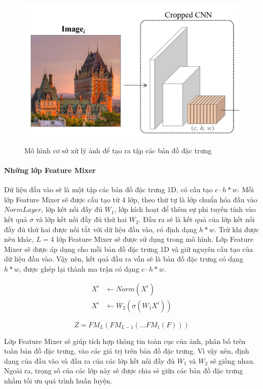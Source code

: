 \begin{figure}[H]
    \centering
    \includegraphics[scale=0.75]{pics/Proposal/cropped-cnn.png}
    \caption{Mô hình cơ sở xử lý ảnh để tạo ra tập các bản đồ đặc trưng \cite{alibey2023mixvpr}}
\end{figure}

\paragraph*{Những lớp Feature Mixer}

Dữ liệu đầu vào sẽ là một tập các bản đồ đặc trưng 1D, có cấu tạo $c \cdot h*w$. Mỗi lớp Feature Mixer sẽ được cấu tạo từ 4 lớp, theo thứ tự là lớp chuẩn hóa đầu vào $NormLayer$, lớp kết nối đầy đủ $W_1$, lớp kích hoạt để thêm sự phi tuyến tính vào kết quả $\sigma$ và lớp kết nối đầy đủ thứ hai $W_2$. Đầu ra sẽ là kết quả của lớp kết nối đầy đủ thứ hai được nối tắt với dữ liệu đầu vào, có định dạng $h*w$. Trừ khi được nêu khác, $L=4$ lớp Feature Mixer sẽ được sử dụng trong mô hình. Lớp Feature Mixer sẽ được áp dụng cho mỗi bản đồ đặc trưng 1D và giữ nguyên cấu tạo của dữ liệu đầu vào. Vậy nên, kết quả đầu ra vẫn sẽ là bản đồ đặc trưng có dạng $h*w$, được ghép lại thành ma trận có dạng $c \cdot h*w$.

$$
\begin{aligned}
    X^{i} & \leftarrow Norm(X^{i}) \\
    X^{i} & \leftarrow W_2(\sigma(W_1 X^{i}))
\end{aligned}
$$

$$
Z = FM_L(FM_{L-1}(\dots FM_1(F)))
$$

Lớp Feature Mixer sẽ giúp tích hợp thông tin toàn cục của ảnh, phân bố trên toàn bản đồ đặc trưng, vào các giá trị trên bản đồ đặc trưng. Vì vậy nên, định dạng của đầu vào và đầu ra của các lớp kết nối đầy đủ $W_1$ và $W_2$ sẽ giống nhau. Ngoài ra, trọng số của các lớp này sẽ được chia sẻ giữa các bản đồ đặc trưng nhằm tối ưu quá trình huấn luyện.

